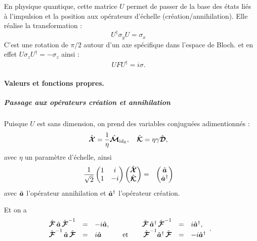 {En physique quantique, cette matrice $U$ permet de passer de la base des états liés à l'impulsion et la position aux opérateurs d'échelle (création/annihilation). Elle réalise la transformation :
\begin{equation}
    U^\dagger \sigma_y U = \sigma_x
\end{equation}
C'est une rotation de $\pi/2$ autour d'un axe spécifique dans l'espace de Bloch.
}
et en effet $U\sigma_zU^\dag = -\sigma_z$ ainsi :
\begin{eqnarray}
    U F U^\dag = i \sigma .
\end{eqnarray}

\paragraph{Valeurs et fonctions propres.}

\subparagraph{Passage aux opérateurs création et annihilation}

Puisque $U$ est sans dimension, on prend des variables conjuguées adimentionnés :
\begin{eqnarray}
    \hat{\bm{\mathcal X}} = \frac{1}\eta  \hat{\bm{\mathcal M}}_{\mathrm{id}_{\mathbb R}} , \quad \hat{\bm{\mathcal K}} = \eta \gamma \hat{\bm{\mathcal D}},
\end{eqnarray}
avec $\eta$ un paramètre d'échelle, ainsi 
\begin{eqnarray}
    \frac{1}{\sqrt{2}}\begin{pmatrix} 1 & i \\ 1 & -i \end{pmatrix}  \begin{pmatrix} \hat{\bm{\mathcal X}} \\\hat{\bm{\mathcal K}} \end{pmatrix} & = &  \begin{pmatrix} \hat{\bm{a}} \\ \hat{\bm{a}}^\dag \end{pmatrix}
\end{eqnarray}
avec $\hat{\bm{a}}$ l'opérateur \guillemotleft{}annihilation\guillemotright{} et $\hat{\bm{a}}^\dag$ l'opérateur \guillemotleft{}création\guillemotright{}.

\smallskip

Et on a 
\begin{eqnarray}
    \begin{array}{rclcrcl}
    \hat{\bm{\mathcal{F}}} \,\hat{\bm{a}} \, \hat{\bm{\mathcal{F}}}^{-1}  &=& -i \hat{\bm{a}},  \quad && \quad  \hat{\bm{\mathcal{F}}}\, \hat{\bm{a}}^\dag \, \hat{\bm{\mathcal{F}}}^{-1}&= & i\hat{\bm{a}}^\dag ,\\
    \hat{\bm{\mathcal{F}}}^{-1} \,\hat{\bm{a}} \, \hat{\bm{\mathcal{F}}} &=& i \hat{\bm{a}}  \quad &\mbox{et}& \quad  \hat{\bm{\mathcal{F}}}^{-1} \hat{\bm{a}}^\dag \, \hat{\bm{\mathcal{F}}} &= & -i\hat{\bm{a}}^\dag
    \end{array} .
\end{eqnarray}


